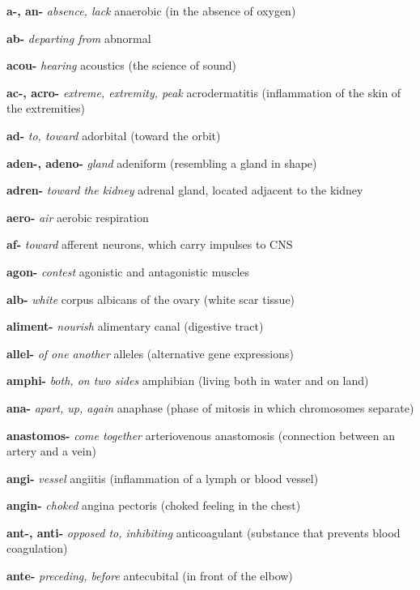 \documentclass[10pt]{article}
\begin{document}
\begin{multicols}{2}
 \footnotesize
 \begin{hangparas}{10pt}{1}
 \textbf{a-, an-} \textit{absence, lack} anaerobic (in the absence of oxygen) \par
 \textbf{ab-} \textit{departing from} abnormal \par
 \textbf{acou-} \textit{hearing} acoustics (the science of sound) \par
 \textbf{ac-, acro-} \textit{extreme, extremity, peak} acrodermatitis (inflammation of the skin of the extremities) \par
 \textbf{ad-} \textit{to, toward} adorbital (toward the orbit) \par
 \textbf{aden-, adeno-} \textit{gland} adeniform (resembling a gland in shape) \par
 \textbf{adren-} \textit{toward the kidney} adrenal gland, located adjacent to the kidney \par
 \textbf{aero-} \textit{air} aerobic respiration \par
 \textbf{af-} \textit{toward} afferent neurons, which carry impulses to CNS \par
 \textbf{agon-} \textit{contest} agonistic and antagonistic muscles \par
 \textbf{alb-} \textit{white} corpus albicans of the ovary (white scar tissue) \par
 \textbf{aliment-} \textit{nourish} alimentary canal (digestive tract) \par
 \textbf{allel-} \textit{of one another} alleles (alternative gene expressions) \par
 \textbf{amphi-} \textit{both, on two sides} amphibian (living both in water and on land)\par
 \textbf{ana-} \textit{apart, up, again} anaphase (phase of mitosis in which chromosomes separate) \par
 \textbf{anastomos-} \textit{come together} arteriovenous anastomosis (connection between an artery and a vein) \par
 \textbf{angi-} \textit{vessel } angiitis (inflammation of a lymph or blood vessel) \par
 \textbf{angin-} \textit{choked } angina pectoris (choked feeling in the chest) \par
 \textbf{ant-, anti-} \textit{opposed to, inhibiting} anticoagulant (substance that prevents blood coagulation) \par
 \textbf{ante-} \textit{preceding, before } antecubital (in front of the elbow) \par

\end{hangparas}
\end{multicols}
\end{document}
